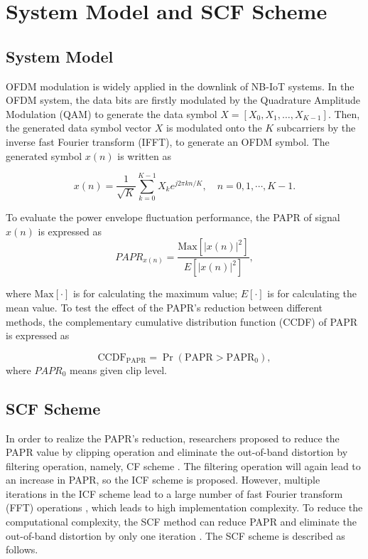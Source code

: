 \documentclass[journal]{IEEEtran}
\begin{document}
\section{System Model and SCF Scheme}

\subsection{System Model}
OFDM modulation is widely applied in the downlink of NB-IoT systems. In the OFDM system, the data bits are firstly modulated by the Quadrature Amplitude Modulation (QAM) to generate the data symbol $X = [X_0, X_1, \dots, X_{K-1}]$. Then, the generated data symbol vector $X$ is modulated onto the $K$ subcarriers by the inverse fast Fourier transform (IFFT), to generate an OFDM symbol. The generated symbol $x(n)$ is written as

\begin{equation}
x(n) = \frac{1}{\sqrt{K}} \sum_{k=0}^{K-1} X_k e^{j2\pi kn/K}, \quad n = 0, 1, \cdots, K - 1.
\label{eq1}
\end{equation}

To evaluate the power envelope fluctuation performance, the PAPR of signal $x(n)$ is expressed as
\begin{equation}
PAPR_{x(n)} = \frac{\text{Max}\left[|x(n)|^2\right]}{E\left[|x(n)|^2\right]},
\label{eq2}
\end{equation}

where $\text{Max} [\cdot]$ is for calculating the maximum value; $E[\cdot]$ is for calculating the mean value.
To test the effect of the PAPR's reduction between different methods, the complementary cumulative distribution function (CCDF) of PAPR is expressed as

\begin{equation}
\text{CCDF}_{\text{PAPR}} = \Pr (\text{PAPR} > \text{PAPR}_0),
\label{eq3}
\end{equation}
where $PAPR_0$ means given clip level.

\subsection{SCF Scheme}
In order to realize the PAPR’s reduction, researchers proposed to reduce the PAPR value by clipping operation and eliminate the out-of-band distortion by filtering operation, namely, CF scheme \cite{b21}. The filtering operation will again lead to an increase in PAPR, so the ICF scheme is proposed. However, multiple iterations in the ICF scheme lead to a large number of fast Fourier transform (FFT) operations \cite{b13}, which leads to high implementation complexity. To reduce the computational complexity, the SCF method can reduce PAPR and eliminate the out-of-band distortion by only one iteration \cite{b22}. The SCF scheme is described as follows.
\end{document}
